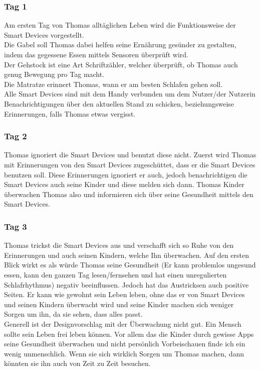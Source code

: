 \subsubsection{\textbf{Tag 1}} 
Am ersten Tag von Thomas alltäglichen Leben wird die Funktionsweise der Smart Devices vorgestellt. \\
Die Gabel soll Thomas dabei helfen seine Ernährung gesünder zu gestalten, indem das gegessene Essen mittels Sensoren überprüft wird. \\
Der Gehstock ist eine Art Schriftzähler, welcher überprüft, ob Thomas auch genug Bewegung pro Tag macht. \\
Die Matratze erinnert Thomas, wann er am besten Schlafen gehen soll. \\
Alle Smart Devices sind mit dem Handy verbunden um dem Nutzer/der Nutzerin Benachrichtigungen über den aktuellen Stand zu schicken, beziehungsweise Erinnerungen, falls Thomas etwas vergisst.
\subsubsection{\textbf{Tag 2}} 
Thomas ignoriert die Smart Devices und benutzt diese nicht. Zuerst wird Thomas mit Erinnerungen von den Smart Devices zugeschüttet, dass er die Smart Devices benutzen soll. Diese Erinnerungen ignoriert er auch, jedoch benachrichtigen die Smart Devices auch seine Kinder und diese melden sich dann. Thomas Kinder überwachen Thomas also und informieren sich über seine Gesundheit mittels den Smart Devices.
\subsubsection{\textbf{Tag 3}} 
Thomas trickst die Smart Devices aus und verschafft sich so Ruhe von den Erinnerungen und auch seinen Kindern, welche Ihn überwachen. Auf den ersten Blick wirkt es als würde Thomas seine Gesundheit (Er kann problemlos ungesund essen, kann den ganzen Tag lesen/fernsehen und hat einen unregulierten Schlafrhythmus) negativ beeinflussen. Jedoch hat das Austricksen auch positive Seiten. Er kann wie gewohnt sein Leben leben, ohne das er von Smart Devices und seinen Kindern überwacht wird und seine Kinder machen sich weniger Sorgen um ihn, da sie sehen, dass alles passt. \\
Generell ist der Designvorschlag mit der Überwachung nicht gut. Ein Mensch sollte sein Leben frei leben können. Vor allem das die Kinder durch gewisse Apps seine Gesundheit überwachen und nicht persönlich Vorbeischauen finde ich ein wenig unmenschlich. Wenn sie sich wirklich Sorgen um Thomas machen, dann könnten sie ihn auch von Zeit zu Zeit besuchen. \\
